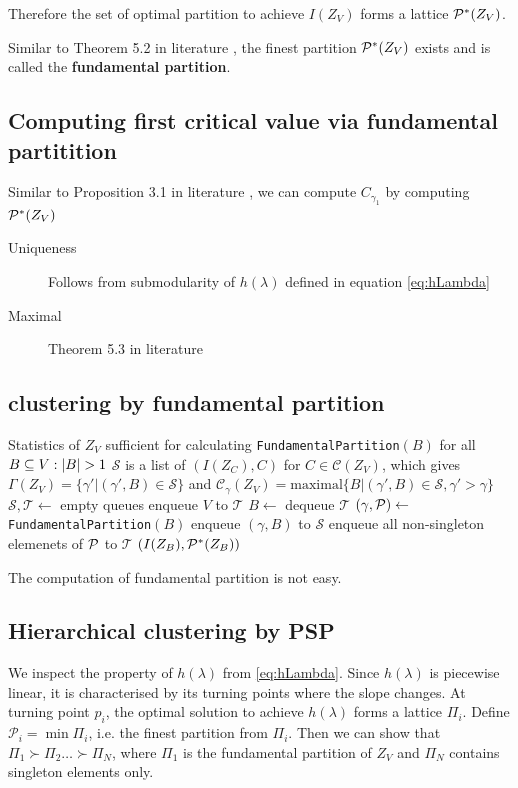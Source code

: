 \documentclass{article}
\begin{document}
Therefore the set of optimal partition to achieve $I(Z_V)$ forms a lattice $\P^*(Z_V)$.

Similar to Theorem 5.2 in literature \cite{ska}, the finest partition $\P^*(Z_V)$ exists and is called the 
\textbf{fundamental partition}.


\subsection{Computing first critical value via fundamental partitition}
Similar to Proposition 3.1 in literature \cite{ic}, we can compute $C_{\gamma_1}$ by computing $\P^*(Z_V)$
\begin{description}
\item[Uniqueness] Follows from submodularity of  $h(\lambda)$ defined in equation \eqref{eq:hLambda}
\item[Maximal] Theorem 5.3 in literature \cite{ska}
\end{description}

\subsection{clustering by fundamental partition}
\begin{algorithm}
\begin{algorithmic}[1]
\REQUIRE Statistics of $Z_V$ sufficient for calculating \texttt{FundamentalPartition}$(B)$ for all $B \subseteq V:\abs{B}>1$
\ENSURE $\mathcal{S}$ is a list of $(I(Z_C),C)$ for $ C \in \mathcal{C}(Z_V)$, which gives
$\Gamma(Z_V) = \{ \gamma' | (\gamma', B) \in \mathcal{S}\} $ and $ \mathcal{C}_{\gamma}(Z_V)
= \mathrm{maximal}\{B | (\gamma', B) \in \mathcal{S}, \gamma' > \gamma \}$
\STATE $\mathcal{S},\mathcal{T} \leftarrow$ empty queues
\STATE enqueue $V$ to $\mathcal{T}$
\STATE $B \leftarrow $ dequeue $\mathcal{T}$
\STATE $(\gamma, \P) \leftarrow$\texttt{FundamentalPartition}$(B)$
\STATE enqueue $(\gamma, B)$ to $\mathcal{S}$
\STATE enqueue all non-singleton elemenets of $\P$ to $\mathcal{T}$
\ENDWHILE
{}
  \RETURN $(I(Z_B), \P^*(Z_B))$
\ENDFUNCTION
\end{algorithmic}
\end{algorithm}

The computation of fundamental partition is not easy.
\subsection{Hierarchical clustering by PSP}
We inspect the property of $h(\lambda)$ from \eqref{eq:hLambda}. Since $h(\lambda)$ is piecewise linear, it is characterised by its turning points where the slope changes.
At turning point $p_i$, the optimal solution to achieve $h(\lambda)$ forms a lattice $\Pi_i$.
Define $\mathcal{P}_i = \min \Pi_i$, i.e. the finest partition from $\Pi_i$. Then we can show that
$\Pi_1 \succ \Pi_2 \dots \succ \Pi_N$, where $\Pi_1$ is the fundamental partition of $Z_V$ and $\Pi_N$ contains singleton elements only.
\end{document}
